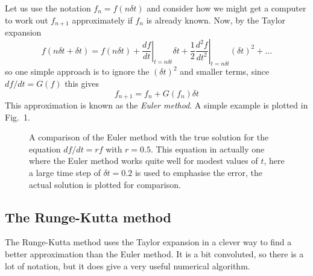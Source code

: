 \documentclass[12pt]{article}
\begin{document}
Let us use the notation $f_n=f(n\delta t)$ and consider how we might
get a computer to work out $f_{n+1}$ approximately if $f_n$ is already
known. Now, by the Taylor expansion
\begin{equation}
f(n\delta t+\delta t)=f(n\delta
t)+\left.\frac{df}{dt}\right|_{t=n\delta t}\delta
t+\frac{1}{2}\left.\frac{d^2f}{dt^2}\right|_{t=n\delta t}(\delta t)^2+\ldots
\end{equation}
so one simple approach is to ignore the $(\delta t)^2$ and smaller terms, since $df/dt=G(f)$ this gives
\begin{equation}
f_{n+1}=f_n+G(f_n)\delta t
\end{equation}
This approximation is known as the \textsl{Euler method}. A simple example is plotted in Fig.~1.

\begin{figure}
\begin{center}

\end{center}
\caption{A comparison of the Euler method with the true solution for
  the equation $df/dt=rf$ with $r=0.5$. This equation in actually one where
  the Euler method works quite well for modest values of $t$, here a
  large time step of $\delta t=0.2$ is used to emphasise the error,
  the actual solution is plotted for
  comparison.}
\end{figure}

\subsection*{The Runge-Kutta method}

The Runge-Kutta method uses the Taylor expansion in a clever way to
find a better approximation than the Euler method. It is a bit
convoluted, so there is a lot of notation, but it does give a very
useful numerical algorithm.
\end{document}
